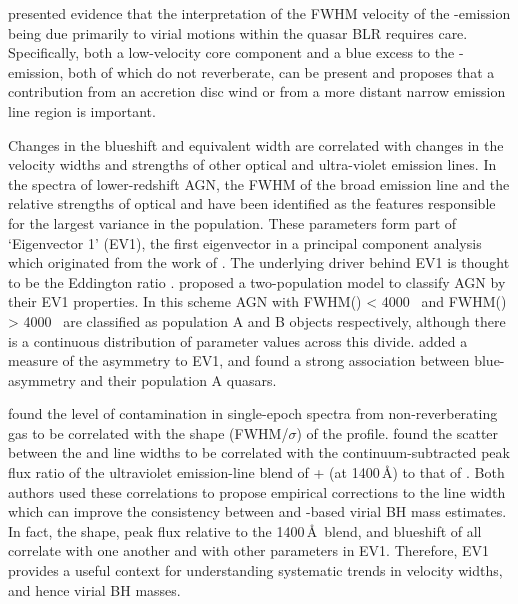 \citet{denney12} presented evidence that the interpretation of the FWHM velocity of the -emission being due primarily to virial motions within the quasar BLR requires care.  
Specifically, both a low-velocity core component and a blue excess to the -emission, both of which do not reverberate, can be present and \citet{denney12} proposes that a contribution from an accretion disc wind or from a more distant narrow emission line region is important.

Changes in the  blueshift and equivalent width are correlated with changes in the velocity widths and strengths of other optical and ultra-violet emission lines.
In the spectra of lower-redshift AGN, the FWHM of the broad \hb emission line and the relative strengths of optical  and \hb have been identified as the features responsible for the largest variance in the population. 
These parameters form part of `Eigenvector 1' (EV1), the first eigenvector in a principal component analysis which originated from the work of \citet{boroson92}.   
The underlying driver behind EV1 is thought to be the Eddington ratio \citep[e.g.][]{sulentic00b,shen14}. 
\citet{sulentic00} proposed a two-population model to classify AGN by their EV1 properties. 
In this scheme AGN with FWHM(\hbns) < 4000 \kms\, and FWHM(\hbns) > 4000 \kms\, are classified as population A and B objects respectively, although there is a continuous distribution of parameter values across this divide. 
\citet{sulentic07} added a measure of the  asymmetry to EV1, and found a strong association between blue-asymmetry and their population A quasars.

\citet{denney12} found the level of contamination in single-epoch spectra from non-reverberating gas to be correlated with the shape (FWHM/$\sigma$) of the  profile. 
\citet{runnoe13} found the scatter between the  and \hb line widths to be correlated with the continuum-subtracted peak flux ratio of the ultraviolet emission-line blend of + (at 1400\,\AA) to that of . 
Both authors used these correlations to propose empirical corrections to the  line width which can improve the consistency between  and \hbns-based virial BH mass estimates. 
In fact, the shape, peak flux relative to the 1400\,\AA\, blend, and blueshift of  all correlate with one another and with other parameters in EV1.
Therefore, EV1 provides a useful context for understanding systematic trends in  velocity widths, and hence virial BH masses. 



